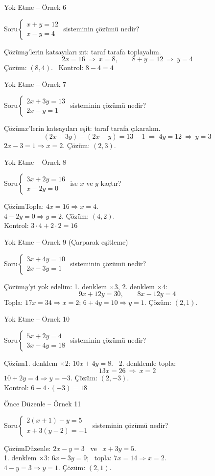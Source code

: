 \documentclass[aspectratio=169,11pt,handout]{beamer}
\newcommand{\soru}[3]{%
\begin{frame}{#1}
  \begin{block}{Soru}\large #2\end{block}
  \pause
  \begin{exampleblock}{Çözüm}\large #3\end{exampleblock}
\end{frame}}
\begin{document}
\soru{Yok Etme -- Örnek 6}
{\(\begin{cases}x+y=12\\ x-y=4\end{cases}\) \quad sisteminin çözümü nedir?}
{\(y\)'lerin katsayıları zıt: taraf tarafa toplayalım.
\[2x=16\ \Rightarrow\ x=8,\qquad 8+y=12\ \Rightarrow\ y=4\]
Çözüm: \((8,4)\). \ Kontrol: \(8-4=4\) \checkmark}

\soru{Yok Etme -- Örnek 7}
{\(\begin{cases}2x+3y=13\\ 2x-y=1\end{cases}\) \quad sisteminin çözümü nedir?}
{\(x\)'lerin katsayıları eşit: taraf tarafa çıkaralım.
\[(2x+3y)-(2x-y)=13-1\ \Rightarrow\ 4y=12\ \Rightarrow\ y=3\]
\(2x-3=1\Rightarrow x=2\). \quad Çözüm: \((2,3)\).}

\soru{Yok Etme -- Örnek 8}
{\(\begin{cases}3x+2y=16\\ x-2y=0\end{cases}\) \quad ise \(x\) ve \(y\) kaçtır?}
{Topla: \(4x=16\Rightarrow x=4\).\\[3pt]
\(4-2y=0\Rightarrow y=2\). \quad Çözüm: \((4,2)\).\\[3pt]
Kontrol: \(3\cdot 4+2\cdot 2=16\) \checkmark}

\soru{Yok Etme -- Örnek 9 (Çarparak eşitleme)}
{\(\begin{cases}3x+4y=10\\ 2x-3y=1\end{cases}\) \quad sisteminin çözümü nedir?}
{\(y\)'yi yok edelim: 1. denklem \(\times 3\), 2. denklem \(\times 4\):
\[9x+12y=30,\qquad 8x-12y=4\]
Topla: \(17x=34\Rightarrow x=2\); \quad \(6+4y=10\Rightarrow y=1\). \quad Çözüm: \((2,1)\).}

\soru{Yok Etme -- Örnek 10}
{\(\begin{cases}5x+2y=4\\ 3x-4y=18\end{cases}\) \quad sisteminin çözümü nedir?}
{1. denklem \(\times 2\): \(10x+4y=8\). \ 2. denklemle topla:
\[13x=26\ \Rightarrow\ x=2\]
\(10+2y=4\Rightarrow y=-3\). \quad Çözüm: \((2,-3)\).\\[2pt]
Kontrol: \(6-4\cdot(-3)=18\) \checkmark}

\soru{Önce Düzenle -- Örnek 11}
{\(\begin{cases}2(x+1)-y=5\\ x+3(y-2)=-1\end{cases}\) \quad sisteminin çözümü nedir?}
{Düzenle: \(2x-y=3\) \ ve \ \(x+3y=5\).\\[3pt]
1. denklem \(\times 3\): \(6x-3y=9\); \ topla: \(7x=14\Rightarrow x=2\).\\[3pt]
\(4-y=3\Rightarrow y=1\). \quad Çözüm: \((2,1)\).}
\end{document}
